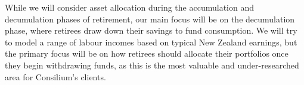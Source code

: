 \documentclass[11pt]{article}
\begin{document}
While we will consider asset allocation during the accumulation and decumulation phases of retirement, our main focus will be on the decumulation phase, where retirees draw down their savings to fund consumption. We will try to model a range of labour incomes based on typical New Zealand earnings, but the primary focus will be on how retirees should allocate their portfolios once they begin withdrawing funds, as this is the most valuable and under-researched area for Consilium's clients.


\printbibliography
\end{document}
